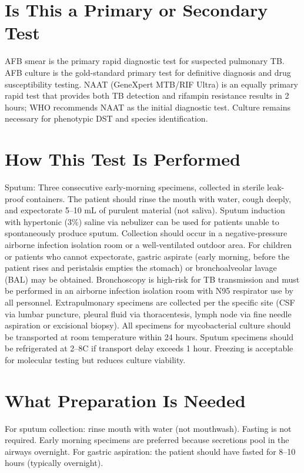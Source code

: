 \section*{Is This a Primary or Secondary Test}
AFB smear is the primary rapid diagnostic test for suspected pulmonary TB. AFB culture is the gold-standard primary test for definitive diagnosis and drug susceptibility testing. NAAT (GeneXpert MTB/RIF Ultra) is an equally primary rapid test that provides both TB detection and rifampin resistance results in 2 hours; WHO recommends NAAT as the initial diagnostic test. Culture remains necessary for phenotypic DST and species identification.

\section*{How This Test Is Performed}
Sputum: Three consecutive early-morning specimens, collected in sterile leak-proof containers. The patient should rinse the mouth with water, cough deeply, and expectorate 5--10 mL of purulent material (not saliva). Sputum induction with hypertonic (3\%) saline via nebulizer can be used for patients unable to spontaneously produce sputum. Collection should occur in a negative-pressure airborne infection isolation room or a well-ventilated outdoor area. For children or patients who cannot expectorate, gastric aspirate (early morning, before the patient rises and peristalsis empties the stomach) or bronchoalveolar lavage (BAL) may be obtained. Bronchoscopy is high-risk for TB transmission and must be performed in an airborne infection isolation room with N95 respirator use by all personnel. Extrapulmonary specimens are collected per the specific site (CSF via lumbar puncture, pleural fluid via thoracentesis, lymph node via fine needle aspiration or excisional biopsy). All specimens for mycobacterial culture should be transported at room temperature within 24 hours. Sputum specimens should be refrigerated at 2--8\textdegree{}C if transport delay exceeds 1 hour. Freezing is acceptable for molecular testing but reduces culture viability.

\section*{What Preparation Is Needed}
For sputum collection: rinse mouth with water (not mouthwash). Fasting is not required. Early morning specimens are preferred because secretions pool in the airways overnight. For gastric aspiration: the patient should have fasted for 8--10 hours (typically overnight).


